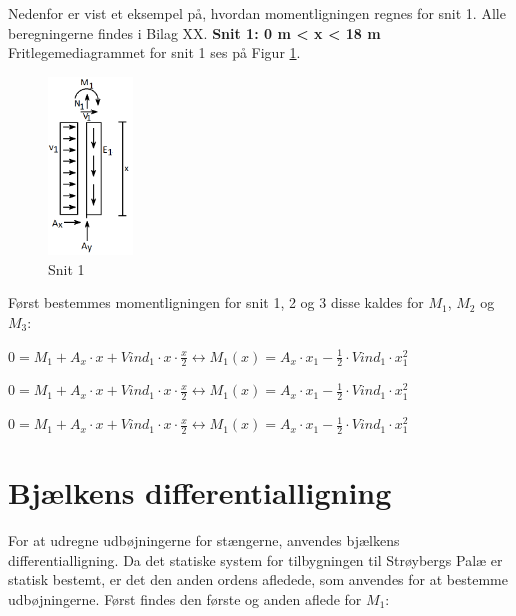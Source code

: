 Nedenfor er vist et eksempel på, hvordan momentligningen regnes for snit 1. Alle beregningerne findes i Bilag XX.
\newline
\newline
\textbf{Snit 1: 0 m < x < 18 m}
\newline
Fritlegemediagrammet for snit 1 ses på Figur \ref{fig:snitetan}.
\begin{figure}[H]
	\centering
	\includegraphics[width=0.2\textwidth]{billeder/asnitet.png}
	\caption{Snit 1}
	\label{fig:snitetan}
\end{figure}


Først bestemmes momentligningen for snit 1, 2 og 3 disse kaldes for $M_1$, $M_2$ og $M_3$:
\begin{center}
	$0 = M_1 + A_x \cdot x + Vind_1\cdot x\cdot \frac{x}{2} \leftrightarrow M_1(x) = A_x\cdot x_1 -\frac{1}{2}\cdot Vind_1 \cdot x_1^2$
\end{center}

\begin{center}
	$0 = M_1 + A_x \cdot x + Vind_1\cdot x\cdot \frac{x}{2} \leftrightarrow M_1(x) = A_x\cdot x_1 -\frac{1}{2}\cdot Vind_1 \cdot x_1^2$
\end{center}

\begin{center}
	$0 = M_1 + A_x \cdot x + Vind_1\cdot x\cdot \frac{x}{2} \leftrightarrow M_1(x) = A_x\cdot x_1 -\frac{1}{2}\cdot Vind_1 \cdot x_1^2$
\end{center}

\section{Bjælkens differentialligning}
For at udregne udbøjningerne for stængerne, anvendes bjælkens differentialligning. Da det statiske system for tilbygningen til Strøybergs Palæ er statisk bestemt, er det den anden ordens afledede, som anvendes for at bestemme udbøjningerne.
\newline
Først findes den første og anden aflede for $M_1$: %
 
